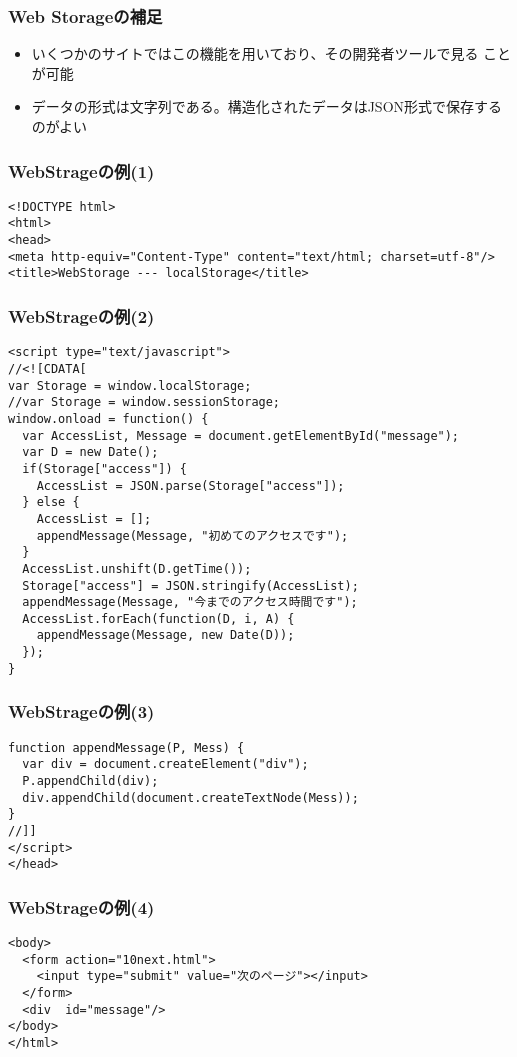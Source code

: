  \begin{frame}[containsverbatim]
 \frametitle{Web Storageの補足}
 \begin{itemize}
 \item いくつかのサイトではこの機能を用いており、その開発者ツールで見る
       ことが可能
 \item データの形式は文字列である。構造化されたデータはJSON形式で保存するのがよい
 \end{itemize}
 \end{frame}
\begin{frame}[containsverbatim]
 \frametitle{WebStrageの例(1)}
 {\small
 \begin{verbatim}
<!DOCTYPE html>
<html>
<head>
<meta http-equiv="Content-Type" content="text/html; charset=utf-8"/>
<title>WebStorage --- localStorage</title>
\end{verbatim}
 }
 \end{frame}
\begin{frame}[containsverbatim]
 \frametitle{WebStrageの例(2)}
 {\small
  \begin{verbatim}
<script type="text/javascript">
//<![CDATA[
var Storage = window.localStorage;
//var Storage = window.sessionStorage;
window.onload = function() {
  var AccessList, Message = document.getElementById("message");
  var D = new Date();
  if(Storage["access"]) {
    AccessList = JSON.parse(Storage["access"]);
  } else {
    AccessList = [];
    appendMessage(Message, "初めてのアクセスです");
  }
  AccessList.unshift(D.getTime());
  Storage["access"] = JSON.stringify(AccessList);
  appendMessage(Message, "今までのアクセス時間です");
  AccessList.forEach(function(D, i, A) {
    appendMessage(Message, new Date(D));
  });
}
\end{verbatim}
 }
 \end{frame}
\begin{frame}[containsverbatim]
 \frametitle{WebStrageの例(3)}
 {\small
  \begin{verbatim}
function appendMessage(P, Mess) {
  var div = document.createElement("div");
  P.appendChild(div);
  div.appendChild(document.createTextNode(Mess));
}
//]]
</script>
</head>
 \end{verbatim}
 }
\end{frame}
\begin{frame}[containsverbatim]
 \frametitle{WebStrageの例(4)}
 {\small
  \begin{verbatim}
<body>
  <form action="10next.html">
    <input type="submit" value="次のページ"></input>
  </form>
  <div  id="message"/>
</body>
</html>
\end{verbatim}
 }
\end{frame}

